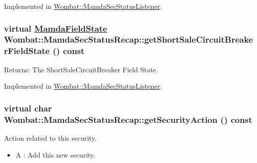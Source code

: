 Implemented in \hyperlink{classWombat_1_1MamdaSecStatusListener_4cb86f6d7afb14e8d6411221d8941805}{Wombat::Mamda\-Sec\-Status\-Listener}.\hypertarget{classWombat_1_1MamdaSecStatusRecap_ab1dabb0f90d5d2bccb7e6a5c2a80f98}{
\subsubsection[getShortSaleCircuitBreakerFieldState]{\setlength{\rightskip}{0pt plus 5cm}virtual \hyperlink{namespaceWombat_93aac974f2ab713554fd12a1fa3b7d2a}{Mamda\-Field\-State} Wombat::Mamda\-Sec\-Status\-Recap::get\-Short\-Sale\-Circuit\-Breaker\-Field\-State () const}}
\label{classWombat_1_1MamdaSecStatusRecap_ab1dabb0f90d5d2bccb7e6a5c2a80f98}


\begin{Desc}
\item[Returns:]The Short\-Sale\-Circuit\-Breaker Field State. \end{Desc}


Implemented in \hyperlink{classWombat_1_1MamdaSecStatusListener_a6bf492643a4963d80cdc05134955358}{Wombat::Mamda\-Sec\-Status\-Listener}.\hypertarget{classWombat_1_1MamdaSecStatusRecap_6cbee9945c643eff18bbe078821de01b}{
\subsubsection[getSecurityAction]{\setlength{\rightskip}{0pt plus 5cm}virtual char Wombat::Mamda\-Sec\-Status\-Recap::get\-Security\-Action () const}}
\label{classWombat_1_1MamdaSecStatusRecap_6cbee9945c643eff18bbe078821de01b}


Action related to this security. 

\begin{itemize}
\item A : Add this new security. \end{itemize}


